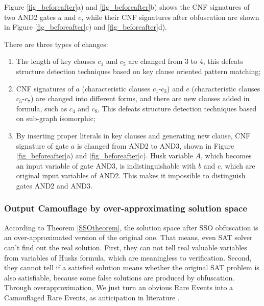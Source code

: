 \documentclass[conference,compsocconf]{IEEEtran}
\begin{document}
Figure \ref{fig_beforeafter}a) and \ref{fig_beforeafter}b) shows the CNF signatures of two AND2 gates $a$ and $e$,
while their CNF signatures after obfuscation are shown in Figure \ref{fig_beforeafter}c) and \ref{fig_beforeafter}d).

There are three types of changes:
\begin{enumerate}
 \item
 The length of key clauses $c_1$ and $c_5$ are changed from 3 to 4,
this defeats structure detection techniques \cite{csFu} based on key clause oriented pattern matching;
 \item
CNF signatures of $a$ (characteristic clauses $c_1$-$c_3$) and $e$ (characteristic clauses $c_5$-$c_7$) are changed into different forms,
and there are new clauses added in formula, such as $c_4$ and $c_8$,
This defeats structure detection techniques\cite{csRoy} based on sub-graph isomorphic;
\item 
 By inserting proper literals in key clauses and generating new clause,
 CNF signature of gate $a$ is changed from AND2 to AND3,
shown in Figure \ref{fig_beforeafter}a) and \ref{fig_beforeafter}c).
Husk variable $A$,
which becomes an input variable of gate AND3,
is indistinguishable with $b$ and $c$,
which are original input variables of AND2.
This makes it impossible to distinguish gates AND2 and AND3.
\end{enumerate}

\subsubsection{Output Camouflage by over-approximating solution space}
According to Theorem \ref{SSOtheorem},
the solution space after SSO obfuscation is an over-approximated version of the original one.
That means, even SAT solver can't find out the real solution.
First, they can not tell real valuable variables from variables of Husks formula, 
which are meaningless to verification.
Second, they cannot tell if a satisfied solution means whether the original SAT problem is also satisfiable,
because some false solutions are produced by obfuscation.
Through overapproximation, We just turn an obvious Rare Events into a Camouflaged Rare Events, 
as anticipation in literature \cite{HV-grid} .
\end{document}
